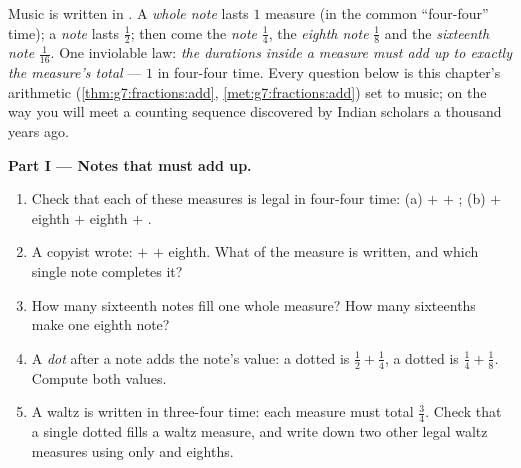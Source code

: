 \begin{problem}
\label{pb:g7:fractions:1}
Music is written in . A \emph{whole note} lasts $1$
measure (in the common ``four-four'' time); a \emph{ note}
lasts $\frac12$; then come the \emph{ note} $\frac14$, the
\emph{eighth note} $\frac18$ and the \emph{sixteenth note}
$\frac{1}{16}$. One inviolable law: \emph{the durations inside a
measure must add up to exactly the measure's total} --- $1$ in
four-four time. Every question below is this chapter's arithmetic
(\cref{thm:g7:fractions:add}, \cref{met:g7:fractions:add}) set to
music; on the way you will meet a counting sequence discovered by
Indian scholars a thousand years ago.

\medskip
\noindent\textbf{Part I --- Notes that must add up.}
\begin{enumerate}
  \item Check that each of these measures is legal in four-four
        time: (a)  $+$  $+$ ; (b)  $+$
        eighth $+$ eighth $+$ .
  \item A copyist wrote:  $+$  $+$ eighth. What
         of the measure is written, and which single
        note completes it?
  \item How many sixteenth notes fill one whole measure? How
        many sixteenths make one eighth note?
  \item A \emph{dot} after a note adds  the note's value: a
        dotted  is $\frac12 + \frac14$, a dotted  is
        $\frac14 + \frac18$. Compute both values.
  \item A waltz is written in three-four time: each measure must
        total $\frac34$. Check that a single dotted  fills a
        waltz measure, and write down two other legal waltz
        measures using only  and eighths.
\end{enumerate}


\end{problem}

